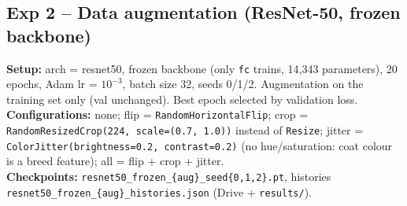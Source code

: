 \subsection*{Exp 2 -- Data augmentation (ResNet-50, frozen backbone)}
\textbf{Setup:} arch = resnet50, frozen backbone (only \texttt{fc} trains, 14{,}343 parameters),
20 epochs, Adam lr = $10^{-3}$, batch size 32, seeds 0/1/2. Augmentation on the training set only
(val unchanged). Best epoch selected by validation loss.\\
\textbf{Configurations:}
none;
flip = \texttt{RandomHorizontalFlip};
crop = \texttt{RandomResizedCrop(224, scale=(0.7, 1.0))} instead of \texttt{Resize};
jitter = \texttt{ColorJitter(brightness=0.2, contrast=0.2)} (no hue/saturation: coat colour is a breed feature);
all = flip + crop + jitter.\\
\textbf{Checkpoints:} \texttt{resnet50\_frozen\_\{aug\}\_seed\{0,1,2\}.pt},
histories \texttt{resnet50\_frozen\_\{aug\}\_histories.json} (Drive + \texttt{results/}).

